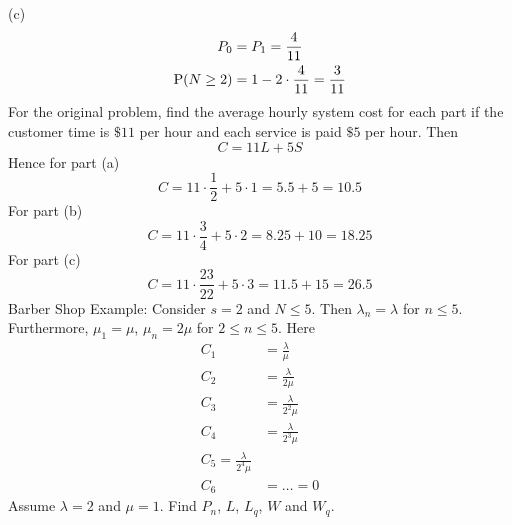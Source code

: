 \documentclass[12pt]{article}
\begin{document}
(c) $$ \begin{aligned} P_0 &= P_1 = \frac{4}{11} \\ \mathrm{P}( N\geq 2 ) &= 1 - 2\cdot \frac{4}{11} = \frac{3}{11} \end{aligned} $$ 
For the original problem, find the average hourly system cost for each part if the customer time is $\$11$ per hour and each service is paid $\$5$ per hour. Then $$C = 11L + 5S$$ 
Hence for part (a) $$ C = 11 \cdot \frac{1}{2} + 5 \cdot 1 = 5.5 + 5 = 10.5 $$ 
For part (b) $$ C = 11 \cdot \frac{3}{4} + 5 \cdot 2 = 8.25 + 10 = 18.25 $$ 
For part (c) $$ C = 11 \cdot \frac{23}{22} + 5 \cdot 3 = 11.5 + 15 = 26.5 $$ 
Barber Shop Example: Consider $s=2$ and $N \leq 5$. Then $\lambda_n = \lambda$ for $n \leq 5$. Furthermore, $\mu_1 = \mu$, $\mu_n = 2\mu$ for $2 \leq n \leq 5$. Here
$$ \begin{aligned} C_1 &= \frac{\lambda}{\mu} \\ C_2 &= \frac{\lambda}{2\mu} \\ C_3 &= \frac{\lambda}{2^2 \mu} \\ C_4 &= \frac{\lambda}{2^3 \mu} \\ C_5 = \frac{\lambda}{2^4 \mu} \\ C_6 &= \dots = 0 \end{aligned} $$ 
Assume $\lambda=2$ and $\mu=1$. Find $P_n$, $L$, $L_q$, $W$ and $W_q$. 
\end{document}
